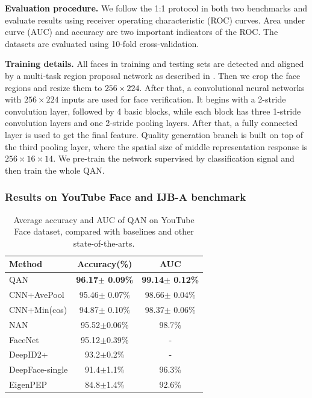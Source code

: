 \textbf{Evaluation procedure.} We follow the 1:1 protocol in both two benchmarks and evaluate results using receiver operating characteristic (ROC) curves. Area under curve (AUC) and accuracy are two important indicators of the ROC. The datasets are evaluated using 10-fold cross-validation.

\textbf{Training details.}
All faces in training and testing sets are detected and aligned by a multi-task region proposal network as described in \cite{chen2016supervised}. Then we crop the face regions and resize them to $256\times 224$. After that, a convolutional neural networks with $256\times 224$ inputs are used for face verification. It begins with a 2-stride convolution layer, followed by 4 basic blocks, while each block has three 1-stride convolution layers and one 2-stride pooling layers. After that, a fully connected layer is used to get the final feature. Quality generation branch is built on top of the third pooling layer, where the spatial size of middle representation response is $256\times 16 \times 14$. We pre-train the network supervised by classification signal and then train the whole QAN.



\subsubsection{Results on YouTube Face and IJB-A benchmark}


\begin{table}[h]
\normalsize
  \centering
  \begin{tabular}{l|c|c}
    \hline
    Method & Accuracy(\%) &AUC \\
    \hline
       QAN   & \bf{96.17$\pm$ 0.09\%} & \bf{99.14$\pm$ 0.12\%} \\
       CNN+AvePool 	 & 95.46$\pm$ 0.07\% & 98.66$\pm$ 0.04\% \\
       CNN+Min(cos)  & 94.87$\pm$ 0.10\% & 98.37$\pm$ 0.06\% \\
    \hline
       NAN\cite{yang2016neural}			 & 95.52$\pm$0.06\% & 98.7\% \\
       FaceNet\cite{schroff2015facenet} 	& 95.12$\pm$0.39\% & - \\
       DeepID2+\cite{sun2015deeply}			& 93.2$\pm$0.2\% & - \\
       DeepFace-single\cite{taigman2014deepface}		& 91.4$\pm$1.1\% & 96.3\% \\
       EigenPEP\cite{li2014eigen}			& 84.8$\pm$1.4\% & 92.6\% \\
    \hline
  \end{tabular}

  \caption{Average accuracy and AUC of QAN on YouTube Face dataset, compared with baselines and other state-of-the-arts.}
  \label{tab:ytf}
\end{table}

